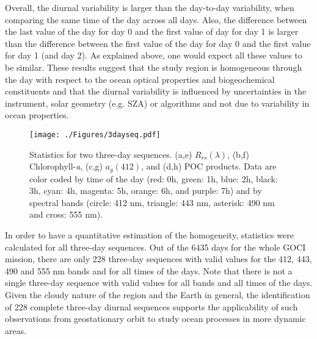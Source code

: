 \documentclass[onecolumn,3p,letterpaper,11pt]{elsarticle}
\begin{document}
Overall, the diurnal variability is larger than the day-to-day variability, when comparing the same time of the day across all days. Also, the difference between the last value of the day for day 0 and the first value of day for day 1 is larger than the difference between the first value of the day for day 0 and the first value for day 1 (and day 2). As explained above, one would expect all these values to be similar. These results suggest that the study region is homogeneous through the day with respect to the ocean optical properties and biogeochemical constituents and that the diurnal variability is influenced by uncertainties in the instrument, solar geometry (e.g. SZA) or algorithms and not due to variability in ocean properties.
\begin{figure}[H]

\centering
\hspace{-0.8cm}
\texttt{[image: ./Figures/3dayseq.pdf]}

\caption{ Statistics for two three-day sequences. (a,e) $R_{rs}(\lambda)$, (b,f) Chlorophyll-{\it a}, (c,g) $a_g(412)$, and (d,h) POC products. Data are color coded by time of the day (red: 0h, green: 1h, blue: 2h, black: 3h, cyan: 4h, magenta: 5h, orange: 6h, and purple: 7h) and by spectral bands (circle: 412 nm, triangle: 443 nm, asterisk: 490 nm and cross: 555 nm).\label{fig:3dayseq} }     


\end{figure}
In order to have a quantitative estimation of the homogeneity, statistics were calculated for all three-day sequences. Out of the 6435 days for the whole GOCI mission, there are only 228 three-day sequences with valid values for the 412, 443, 490 and 555 nm bands and for all times of the days. Note that there is not a single three-day sequence with valid values for all bands and all times of the days. Given the cloudy nature of the region and the Earth in general, the identification of 228 complete three-day diurnal sequences supports the applicability of such observations from geostationary orbit to study ocean processes in more dynamic areas. 
\end{document}
